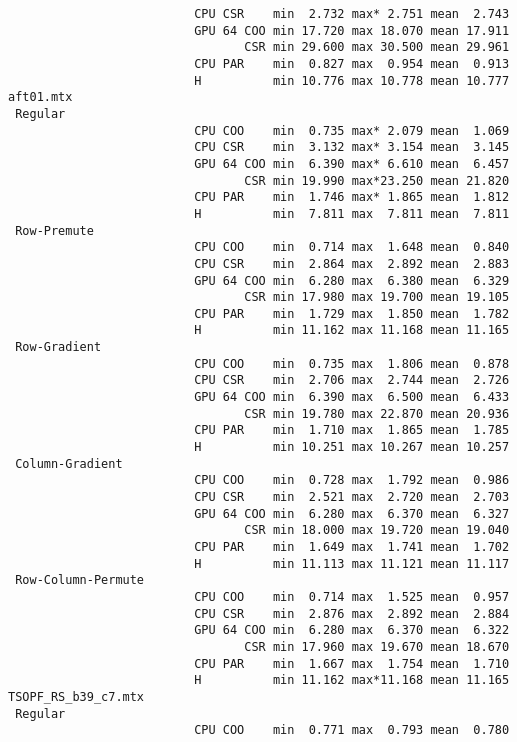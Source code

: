 \begin{verbatim}
                          CPU CSR    min  2.732 max* 2.751 mean  2.743
                          GPU 64 COO min 17.720 max 18.070 mean 17.911
                                 CSR min 29.600 max 30.500 mean 29.961
                          CPU PAR    min  0.827 max  0.954 mean  0.913
                          H          min 10.776 max 10.778 mean 10.777
aft01.mtx
 Regular
                          CPU COO    min  0.735 max* 2.079 mean  1.069
                          CPU CSR    min  3.132 max* 3.154 mean  3.145
                          GPU 64 COO min  6.390 max* 6.610 mean  6.457
                                 CSR min 19.990 max*23.250 mean 21.820
                          CPU PAR    min  1.746 max* 1.865 mean  1.812
                          H          min  7.811 max  7.811 mean  7.811
 Row-Premute
                          CPU COO    min  0.714 max  1.648 mean  0.840
                          CPU CSR    min  2.864 max  2.892 mean  2.883
                          GPU 64 COO min  6.280 max  6.380 mean  6.329
                                 CSR min 17.980 max 19.700 mean 19.105
                          CPU PAR    min  1.729 max  1.850 mean  1.782
                          H          min 11.162 max 11.168 mean 11.165
 Row-Gradient
                          CPU COO    min  0.735 max  1.806 mean  0.878
                          CPU CSR    min  2.706 max  2.744 mean  2.726
                          GPU 64 COO min  6.390 max  6.500 mean  6.433
                                 CSR min 19.780 max 22.870 mean 20.936
                          CPU PAR    min  1.710 max  1.865 mean  1.785
                          H          min 10.251 max 10.267 mean 10.257
 Column-Gradient
                          CPU COO    min  0.728 max  1.792 mean  0.986
                          CPU CSR    min  2.521 max  2.720 mean  2.703
                          GPU 64 COO min  6.280 max  6.370 mean  6.327
                                 CSR min 18.000 max 19.720 mean 19.040
                          CPU PAR    min  1.649 max  1.741 mean  1.702
                          H          min 11.113 max 11.121 mean 11.117
 Row-Column-Permute
                          CPU COO    min  0.714 max  1.525 mean  0.957
                          CPU CSR    min  2.876 max  2.892 mean  2.884
                          GPU 64 COO min  6.280 max  6.370 mean  6.322
                                 CSR min 17.960 max 19.670 mean 18.670
                          CPU PAR    min  1.667 max  1.754 mean  1.710
                          H          min 11.162 max*11.168 mean 11.165
TSOPF_RS_b39_c7.mtx
 Regular
                          CPU COO    min  0.771 max  0.793 mean  0.780

\end{verbatim}
